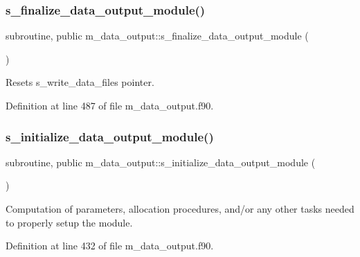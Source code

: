 \subsubsection{\texorpdfstring{s\+\_\+finalize\+\_\+data\+\_\+output\+\_\+module()}{s\_finalize\_data\_output\_module()}}
{\footnotesize\ttfamily subroutine, public m\+\_\+data\+\_\+output\+::s\+\_\+finalize\+\_\+data\+\_\+output\+\_\+module (\begin{DoxyParamCaption}{ }\end{DoxyParamCaption})}



Resets s\+\_\+write\+\_\+data\+\_\+files pointer. 



Definition at line 487 of file m\+\_\+data\+\_\+output.\+f90.

\mbox{\label{namespacem__data__output_ab65b312ef83adb104cafafada9c998b6}} 
\subsubsection{\texorpdfstring{s\+\_\+initialize\+\_\+data\+\_\+output\+\_\+module()}{s\_initialize\_data\_output\_module()}}
{\footnotesize\ttfamily subroutine, public m\+\_\+data\+\_\+output\+::s\+\_\+initialize\+\_\+data\+\_\+output\+\_\+module (\begin{DoxyParamCaption}{ }\end{DoxyParamCaption})}



Computation of parameters, allocation procedures, and/or any other tasks needed to properly setup the module. 



Definition at line 432 of file m\+\_\+data\+\_\+output.\+f90.

\mbox{\label{namespacem__data__output_a12a171700eb3f8a63d17c01a0033cf39}} 
